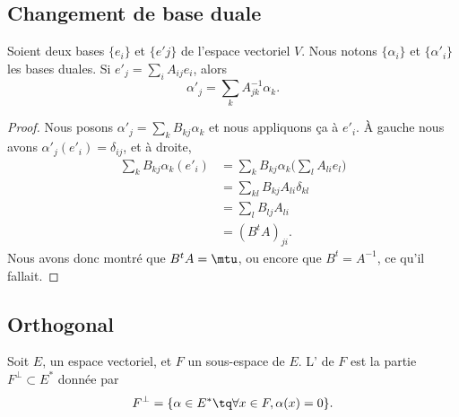 \subsection{Changement de base duale}

\begin{proposition}		\label{PROPooDOEYooDpUbnc}
	Soient deux bases \( \{ e_i \}\) et \( \{ e'j \}\) de l'espace vectoriel \( V\). Nous notons \( \{ \alpha_i \}\) et \( \{ \alpha'_i \}\) les bases duales. Si \( e'_j=\sum_iA_{ij}e_i\), alors
	\begin{equation}
		\alpha'_j=\sum_kA_{jk}^{-1}\alpha_k.
	\end{equation}
\end{proposition}

\begin{proof}
	Nous posons \( \alpha'_j=\sum_kB_{kj}\alpha_k\) et nous appliquons ça à \( e'_i\). À gauche nous avons \( \alpha'_j(e'_i)=\delta_{ij}\), et à droite,
	\begin{subequations}
		\begin{align}
			\sum_kB_{kj}\alpha_k(e'_i) & = \sum_kB_{kj}\alpha_k\big( \sum_lA_{li}e_l \big) \\
			                           & = \sum_{kl}B_{kj}A_{li}\delta_{kl}                \\
			                           & = \sum_lB_{lj}A_{li}                              \\
			                           & = (B^tA)_{ji}.
		\end{align}
	\end{subequations}
	Nous avons donc montré que \( B^tA=\mtu\), ou encore que \( B^t=A^{-1}\), ce qu'il fallait.
\end{proof}

\subsection{Orthogonal}

\begin{definition}      \label{DEFooEQSMooHVzbfz}
	Soit \( E\), un espace vectoriel, et \( F\) un sous-espace de \( E\). L' de \( F\) est la partie \( F^{\perp}\subset E^*\) donnée par
	\begin{equation}    \label{Eqiiyple}
		F^{\perp}=\{ \alpha\in E^*\tq \forall x\in F,\alpha(x)=0 \}.
	\end{equation}
\end{definition}

